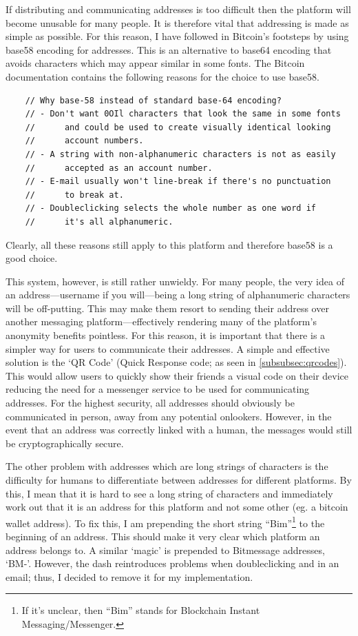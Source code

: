 \documentclass{article}
\begin{document}
If distributing and communicating addresses is too difficult then the platform will become unusable for many people. It is therefore vital that addressing is made as simple as possible. For this reason, I have followed in Bitcoin's footsteps by using base58 encoding for addresses. This is an alternative to base64 encoding that avoids characters which may appear similar in some fonts. The Bitcoin documentation contains the following reasons for the choice to use base58.
\begin{verbatim}
    // Why base-58 instead of standard base-64 encoding?
    // - Don't want 0OIl characters that look the same in some fonts
    //      and could be used to create visually identical looking 
    //      account numbers.
    // - A string with non-alphanumeric characters is not as easily
    //      accepted as an account number.
    // - E-mail usually won't line-break if there's no punctuation
    //      to break at.
    // - Doubleclicking selects the whole number as one word if 
    //      it's all alphanumeric.
\end{verbatim}
Clearly, all these reasons still apply to this platform and therefore base58 is a good choice.

This system, however, is still rather unwieldy. For many people, the very idea of an address---username if you will---being a long string of alphanumeric characters will be off-putting. This may make them resort to sending their address over another messaging platform---effectively rendering many of the platform's anonymity benefits pointless. For this reason, it is important that there is a simpler way for users to communicate their addresses. A simple and effective solution is the `QR Code' (Quick Response code; as seen in \autoref{subsubsec:qrcodes}). This would allow users to quickly show their friends a visual code on their device reducing the need for a messenger service to be used for communicating addresses. For the highest security, all addresses should obviously be communicated in person, away from any potential onlookers. However, in the event that an address was correctly linked with a human, the messages would still be cryptographically secure.

The other problem with addresses which are long strings of characters is the difficulty for humans to differentiate between addresses for different platforms. By this, I mean that it is hard to see a long string of characters and immediately work out that it is an address for this platform and not some other (eg. a bitcoin wallet address). To fix this, I am prepending the short string ``Bim''\footnote{If it's unclear, then ``Bim'' stands for Blockchain Instant Messaging/Messenger.} to the beginning of an address. This should make it very clear which platform an address belongs to. A similar `magic' is prepended to Bitmessage addresses, `BM-'. However, the dash reintroduces problems when doubleclicking and in an email; thus, I decided to remove it for my implementation.
\end{document}
